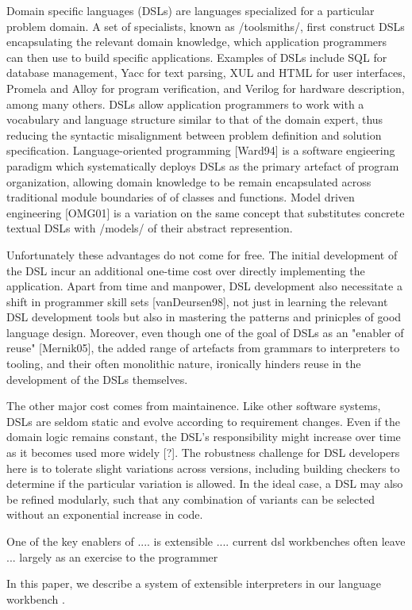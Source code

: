 Domain specific languages (DSLs) are languages specialized for a particular problem domain. A set of specialists, known as /toolsmiths/, first construct DSLs encapsulating the relevant domain knowledge, which application programmers can then use to build specific applications. Examples of DSLs include SQL for database management, Yacc for text parsing, XUL and HTML for user interfaces, Promela and Alloy for program verification, and Verilog for hardware description, among many others. DSLs allow application programmers to work with a vocabulary and language structure similar to that of the domain expert, thus reducing the syntactic misalignment between problem definition and solution specification. Language-oriented programming [Ward94] is a software engieering paradigm which systematically deploys DSLs as the primary artefact of program organization, allowing domain knowledge to be remain encapsulated across traditional module boundaries of of classes and functions. Model driven engineering [OMG01] is a variation on the same concept that substitutes concrete textual DSLs with /models/ of their abstract represention.

Unfortunately these advantages do not come for free. The initial development of the DSL incur an additional one-time cost over directly implementing the application. Apart from time and manpower, DSL development also necessitate a shift in programmer skill sets [vanDeursen98], not just in learning the relevant DSL development tools but also in mastering the patterns and prinicples of good language design. Moreover, even though one of the goal of DSLs as an "enabler of reuse" [Mernik05], the added range of artefacts from grammars to interpreters to tooling, and their often monolithic nature, ironically hinders reuse in the development of the DSLs themselves.

The other major cost comes from maintainence. Like other software systems, DSLs are seldom static and evolve according to requirement changes. Even if the domain logic remains constant, the DSL's responsibility might increase over time as it becomes used more widely [?]. The robustness challenge for DSL developers here is to tolerate slight variations across versions, including building checkers to determine if the particular variation is allowed. In the ideal case, a DSL may also be refined modularly, such that any combination of variants can be selected without an exponential increase in code.

One of the key enablers of .... is extensible .... 
current dsl workbenches often  leave ... largely as an exercise to the programmer



In this paper, we describe a system of extensible interpreters in our language workbench \Enso. 



